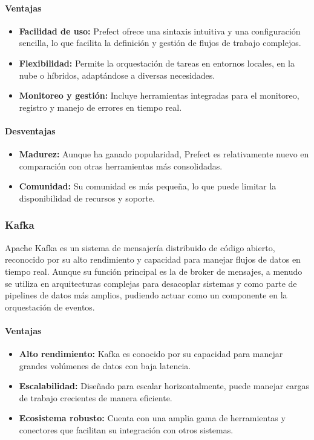 \paragraph{Ventajas}
\begin{itemize}
\item \textbf{Facilidad de uso:} Prefect ofrece una sintaxis intuitiva y una configuración sencilla, lo que facilita la definición y gestión de flujos de trabajo complejos.
\item \textbf{Flexibilidad:} Permite la orquestación de tareas en entornos locales, en la nube o híbridos, adaptándose a diversas necesidades.
\item \textbf{Monitoreo y gestión:} Incluye herramientas integradas para el monitoreo, registro y manejo de errores en tiempo real.
\end{itemize}

\paragraph{Desventajas}
\begin{itemize}
\item \textbf{Madurez:} Aunque ha ganado popularidad, Prefect es relativamente nuevo en comparación con otras herramientas más consolidadas.
\item \textbf{Comunidad:} Su comunidad es más pequeña, lo que puede limitar la disponibilidad de recursos y soporte.
\end{itemize}

\subsubsection{Kafka}
Apache Kafka es un sistema de mensajería distribuido de código abierto, reconocido por su alto rendimiento y capacidad para manejar flujos de datos en tiempo real. Aunque su función principal es la de broker de mensajes, a menudo se utiliza en arquitecturas complejas para desacoplar sistemas y como parte de pipelines de datos más amplios, pudiendo actuar como un componente en la orquestación de eventos.

\paragraph{Ventajas}
\begin{itemize}
\item \textbf{Alto rendimiento:} Kafka es conocido por su capacidad para manejar grandes volúmenes de datos con baja latencia.
\item \textbf{Escalabilidad:} Diseñado para escalar horizontalmente, puede manejar cargas de trabajo crecientes de manera eficiente.
\item \textbf{Ecosistema robusto:} Cuenta con una amplia gama de herramientas y conectores que facilitan su integración con otros sistemas.
\end{itemize}

